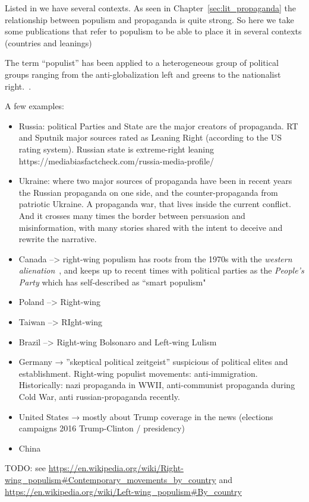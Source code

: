 Listed in \citet{woolley2018computational} we have several contexts. 
As seen in Chapter~\ref{sec:lit_propaganda} the relationship between populism and propaganda is quite strong. So here we take some publications that refer to populism to be able to place it in several contexts (countries and leanings)

The term ``populist” has been applied to a heterogeneous group of political groups ranging from the anti-globalization left and greens to the nationalist right.~\citep{kuzio2010populism}.

A few examples:
\begin{itemize}
    \item Russia: political Parties and State are the major creators of propaganda. RT and Sputnik major sources rated as Leaning Right (according to the US rating system). Russian state is extreme-right leaning https://mediabiasfactcheck.com/russia-media-profile/
    \item Ukraine: where two major sources of propaganda have been in recent years the Russian propaganda on one side, and the counter-propaganda from patriotic Ukraine. A propaganda war, that lives inside the current conflict. And it crosses many times the border between persuasion and misinformation, with many stories shared with the intent to deceive and rewrite the narrative.
    \item Canada --> right-wing populism has roots from the 1970s with the \emph{western alienation}~\citep{henry2000revisiting}, and keeps up to recent times with political parties as the \emph{People's Party} which has self-described as ``smart populism"
    \item Poland --> Right-wing
    \item Taiwan --> RIght-wing
    \item Brazil --> Right-wing Bolsonaro and Left-wing Lulism
    \item Germany → ”skeptical political zeitgeist” suspicious of political elites and establishment. Right-wing populist movements: anti-immigration. Historically: nazi propaganda in WWII, anti-communist propaganda during Cold War, anti russian-propaganda recently.
    \item United States → mostly about Trump coverage in the news (elections campaigns 2016 Trump-Clinton / presidency)
    \item China
\end{itemize}


TODO: see \url{https://en.wikipedia.org/wiki/Right-wing_populism#Contemporary_movements_by_country} 
and \url{https://en.wikipedia.org/wiki/Left-wing_populism#By_country}


